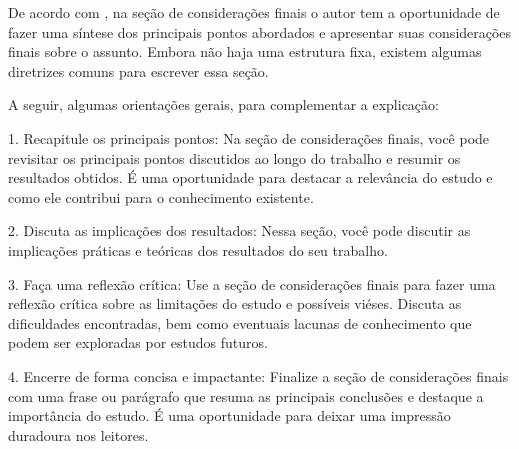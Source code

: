 \documentclass[
	article,			%
	12pt,				%
	oneside,			%
	a4paper,			%
    BIBLATEX,           %
	english,			%
	brazil,				%
	sumario=tradicional
	]{abntex2}
\begin{document}
De acordo com , na seção de considerações finais o autor tem a oportunidade de fazer uma síntese dos principais pontos abordados e apresentar suas considerações finais sobre o assunto. Embora não haja uma estrutura fixa, existem algumas diretrizes comuns para escrever essa seção.

A seguir, algumas orientações gerais, para complementar a explicação:

1. Recapitule os principais pontos: Na seção de considerações finais, você pode revisitar os principais pontos discutidos ao longo do trabalho e resumir os resultados obtidos. É uma oportunidade para destacar a relevância do estudo e como ele contribui para o conhecimento existente.

2. Discuta as implicações dos resultados: Nessa seção, você pode discutir as implicações práticas e teóricas dos resultados do seu trabalho. 

3. Faça uma reflexão crítica: Use a seção de considerações finais para fazer uma reflexão crítica sobre as limitações do estudo e possíveis viéses. Discuta as dificuldades encontradas, bem como eventuais lacunas de conhecimento que podem ser exploradas por estudos futuros.

4. Encerre de forma concisa e impactante: Finalize a seção de considerações finais com uma frase ou parágrafo que resuma as principais conclusões e destaque a importância do estudo. É uma oportunidade para deixar uma impressão duradoura nos leitores.

\postextual


%
%
\end{document}
